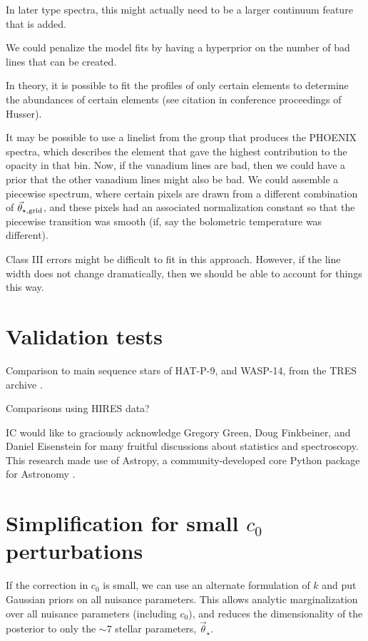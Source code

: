 \documentclass[preprint]{aastex} %
\newcommand{\vt}{\vec{\theta}}
\newcommand{\vg}{\vt_{\star, {\rm grid}}}
\newcommand{\vstar}{\vt_{\star}}
\begin{document}
In later type spectra, this might actually need to be a larger continuum feature that is added.

We could penalize the model fits by having a hyperprior on the number of bad lines that can be created.

In theory, it is possible to fit the profiles of only certain elements to determine the abundances of certain elements (see citation in conference proceedings of Husser). 

It may be possible to use a linelist from the group that produces the PHOENIX spectra, which describes the element that gave the highest contribution to the opacity in that bin. Now, if the vanadium lines are bad, then we could have a prior that the other vanadium lines might also be bad. We could assemble a piecewise spectrum, where certain pixels are drawn from a different combination of $\vg$, and these pixels had an associated normalization constant so that the piecewise transition was smooth (if, say the bolometric temperature was different). 

Class III errors might be difficult to fit in this approach. However, if the line width does not change dramatically, then we should be able to account for things this way.

\section{Validation tests}
Comparison to main sequence stars of HAT-P-9, and WASP-14, from the TRES archive \citep{tfs+12}.

Comparisons using HIRES data?


\acknowledgments
IC would like to graciously acknowledge Gregory Green, Doug Finkbeiner, and Daniel Eisenstein for many fruitful discussions about statistics and spectroscopy. This research made use of Astropy, a community-developed core Python package for Astronomy \citep{art+13}.

\appendix

\section{Simplification for small $c_0$ perturbations}
\label{sec:gaussian_simplification}
If the correction in $c_0$ is small, we can use an alternate formulation of $k$ and put Gaussian priors on all nuisance parameters. This allows analytic marginalization over all nuisance parameters (including $c_0$), and reduces the dimensionality of the posterior to only the $\sim 7$ stellar parameters, $\vstar$.
\end{document}
